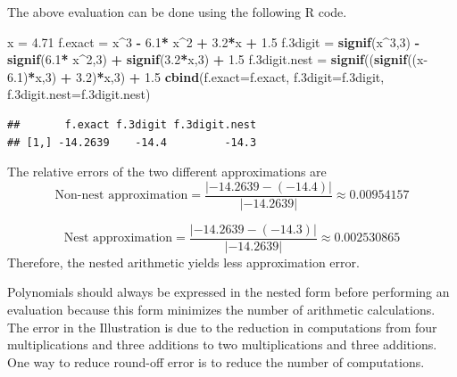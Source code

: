 \documentclass[
]{book}
\newenvironment{Shaded}{\begin{snugshade}}{\end{snugshade}}
\newcommand{\AttributeTok}[1]{\textcolor[rgb]{0.13,0.29,0.53}{#1}}
\newcommand{\DecValTok}[1]{\textcolor[rgb]{0.00,0.00,0.81}{#1}}
\newcommand{\FloatTok}[1]{\textcolor[rgb]{0.00,0.00,0.81}{#1}}
\newcommand{\FunctionTok}[1]{\textcolor[rgb]{0.13,0.29,0.53}{\textbf{#1}}}
\newcommand{\NormalTok}[1]{#1}
\newcommand{\OtherTok}[1]{\textcolor[rgb]{0.56,0.35,0.01}{#1}}
\newcommand{\SpecialCharTok}[1]{\textcolor[rgb]{0.81,0.36,0.00}{\textbf{#1}}}
\begin{document}
The above evaluation can be done using the following R code.

\begin{Shaded}
\begin{Highlighting}[]
\NormalTok{x }\OtherTok{=} \FloatTok{4.71}
\NormalTok{f.exact }\OtherTok{=}\NormalTok{ x}\SpecialCharTok{\^{}}\DecValTok{3} \SpecialCharTok{{-}} \FloatTok{6.1}\SpecialCharTok{*}\NormalTok{ x}\SpecialCharTok{\^{}}\DecValTok{2} \SpecialCharTok{+} \FloatTok{3.2}\SpecialCharTok{*}\NormalTok{x }\SpecialCharTok{+} \FloatTok{1.5}
\NormalTok{f}\FloatTok{.3}\NormalTok{digit }\OtherTok{=} \FunctionTok{signif}\NormalTok{(x}\SpecialCharTok{\^{}}\DecValTok{3}\NormalTok{,}\DecValTok{3}\NormalTok{) }\SpecialCharTok{{-}} \FunctionTok{signif}\NormalTok{(}\FloatTok{6.1}\SpecialCharTok{*}\NormalTok{ x}\SpecialCharTok{\^{}}\DecValTok{2}\NormalTok{,}\DecValTok{3}\NormalTok{) }\SpecialCharTok{+} \FunctionTok{signif}\NormalTok{(}\FloatTok{3.2}\SpecialCharTok{*}\NormalTok{x,}\DecValTok{3}\NormalTok{) }\SpecialCharTok{+} \FloatTok{1.5}
\NormalTok{f}\FloatTok{.3}\NormalTok{digit.nest }\OtherTok{=} \FunctionTok{signif}\NormalTok{((}\FunctionTok{signif}\NormalTok{((x}\FloatTok{{-}6.1}\NormalTok{)}\SpecialCharTok{*}\NormalTok{x,}\DecValTok{3}\NormalTok{) }\SpecialCharTok{+} \FloatTok{3.2}\NormalTok{)}\SpecialCharTok{*}\NormalTok{x,}\DecValTok{3}\NormalTok{) }\SpecialCharTok{+} \FloatTok{1.5}
\FunctionTok{cbind}\NormalTok{(}\AttributeTok{f.exact=}\NormalTok{f.exact, }\AttributeTok{f.3digit=}\NormalTok{f}\FloatTok{.3}\NormalTok{digit, }\AttributeTok{f.3digit.nest=}\NormalTok{f}\FloatTok{.3}\NormalTok{digit.nest)}
\end{Highlighting}
\end{Shaded}

\begin{verbatim}
##       f.exact f.3digit f.3digit.nest
## [1,] -14.2639    -14.4         -14.3
\end{verbatim}

The relative errors of the two different approximations are
\[
\text{Non-nest approximation} = \frac{|-14.2639 - (-14.4)|}{|-14.2639|} \approx 0.00954157
\]

\[
\text{Nest approximation} = \frac{|-14.2639 - (-14.3)|}{|-14.2639|} \approx 0.002530865
\]
Therefore, the nested arithmetic yields less approximation error.

Polynomials should always be expressed in the nested form before performing an evaluation because this form minimizes the number of arithmetic calculations. The error in the Illustration is due to the reduction in computations from four multiplications and three additions to two multiplications and three additions. One way to reduce round-off error is to reduce the number of computations.
\end{document}
